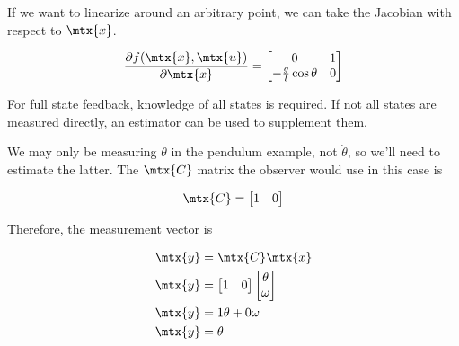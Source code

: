 If we want to linearize around an arbitrary point, we can take the Jacobian with
respect to $\mtx{x}$.

\begin{equation*}
  \frac{\partial f(\mtx{x}, \mtx{u})}{\partial\mtx{x}} =
  \begin{bmatrix}
    0 & 1 \\
    -\frac{g}{l}\cos\theta & 0
  \end{bmatrix}
\end{equation*}

For full \gls{state} feedback, knowledge of all \glspl{state} is required. If
not all \glspl{state} are measured directly, an estimator can be used to
supplement them.

We may only be measuring $\theta$ in the pendulum example, not $\dot{\theta}$,
so we'll need to estimate the latter. The $\mtx{C}$ matrix the \gls{observer}
would use in this case is

\begin{equation*}
  \mtx{C} = \begin{bmatrix}
    1 & 0 \\
  \end{bmatrix}
\end{equation*}

Therefore, the measurement vector is

\begin{align*}
  \mtx{y} &= \mtx{C}\mtx{x} \\
  \mtx{y} &= \begin{bmatrix}
    1 & 0
  \end{bmatrix}
  \begin{bmatrix}
    \theta \\
    \omega
  \end{bmatrix} \\
  \mtx{y} &= 1\theta + 0\omega \\
  \mtx{y} &= \theta
\end{align*}

